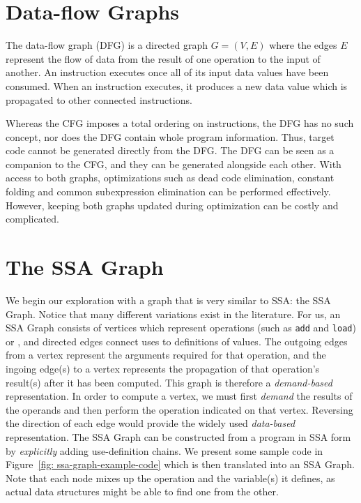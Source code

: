 \section{Data-flow Graphs}

The data-flow graph (DFG) is a directed graph $G=(V,E)$ where the edges $E$ represent the flow of data from the result of one operation to the input of another. 
An instruction executes once all of its input data values have been consumed. 
When an instruction executes, it produces a new data value which is propagated to other connected instructions.

Whereas the CFG imposes a total ordering on instructions, the DFG has no such concept, nor does the DFG contain whole program information. 
Thus, target code cannot be generated directly from the DFG. 
The DFG can be seen as a companion to the CFG, and they can be generated alongside each other. 
With access to both graphs, optimizations such as dead code elimination, constant folding and common subexpression elimination can be performed effectively. 
However, keeping both graphs updated during optimization can be costly and complicated.

\section{The SSA Graph}

We begin our exploration with a graph that is very similar to SSA: 
the SSA Graph. 
Notice that many different variations exist in the literature. 
For us, an SSA Graph consists of vertices which represent operations (such as \texttt{add} and \texttt{load}) or \phifuns, and directed edges connect uses to definitions of values. 
The outgoing edges from a vertex represent the arguments required for that operation, and the ingoing edge(s) to a vertex represents the propagation of that operation's result(s) after it has been computed. 
This graph is therefore a \textit{demand-based} representation. 
In order to compute a vertex, we must first \textit{demand} the results of the operands and then perform the operation indicated on that vertex. 
Reversing the direction of each edge would provide the widely used \emph{data-based} representation. 
The SSA Graph can be constructed from a program in SSA form by \textit{explicitly} adding use-definition chains. 
We present some sample code in Figure~\ref{fig: 
  ssa-graph-example-code} which is then translated into an SSA Graph.
Note that each node mixes up the operation and the variable(s) it defines, as actual data structures might be able to find one from the other.

